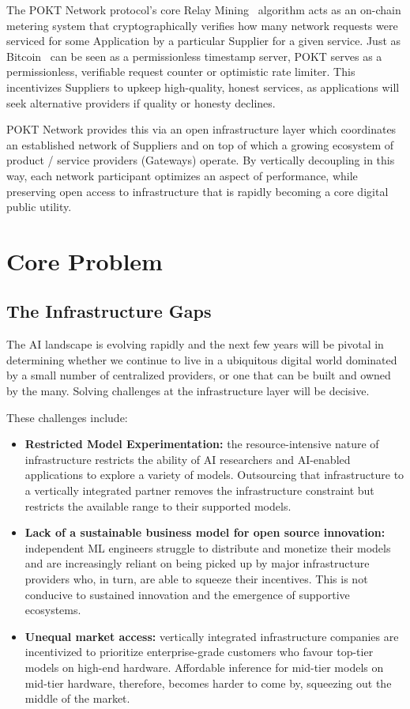 \documentclass[conference,compsoc]{IEEEtran}
\begin{document}
The POKT Network protocol's core Relay Mining~\cite{olshansky2023relay} algorithm acts as an on-chain metering system that cryptographically verifies how many network requests were serviced for some Application by a particular Supplier for a given service. Just as Bitcoin~\cite{nakamoto2008bitcoin} can be seen as a permissionless timestamp server, POKT serves as a permissionless, verifiable request counter or optimistic rate limiter. This incentivizes Suppliers to upkeep high-quality, honest services, as applications will seek alternative providers if quality or honesty declines.

POKT Network provides this via an open infrastructure layer which coordinates an established network of Suppliers and on top of which a growing ecosystem of product / service providers (Gateways) operate. By vertically decoupling in this way, each network participant optimizes an aspect of performance, while preserving open access to infrastructure that is rapidly becoming a core digital public utility. 

\section{Core Problem}

\subsection{The Infrastructure Gaps}

The AI landscape is evolving rapidly and the next few years will be pivotal in determining whether we continue to live in a ubiquitous digital world dominated by a small number of centralized providers, or one that can be built and owned by the many. Solving challenges at the infrastructure layer will be decisive. 

These challenges include:
\begin{itemize}
    \item \textbf{Restricted Model Experimentation:} the resource-intensive nature of infrastructure restricts the ability of AI researchers and AI-enabled applications to explore a variety of models. Outsourcing that infrastructure to a vertically integrated partner removes the infrastructure constraint but restricts the available range to their supported models. 
    \item \textbf{Lack of a sustainable business model for open source innovation:} independent ML engineers struggle to distribute and monetize their models and are increasingly reliant on being picked up by major infrastructure providers who, in turn, are able to squeeze their incentives. This is not conducive to sustained innovation and the emergence of supportive ecosystems.
    \item \textbf{Unequal market access:} vertically integrated infrastructure companies are incentivized to prioritize enterprise-grade customers who favour top-tier models on high-end hardware. Affordable inference for mid-tier models on mid-tier hardware, therefore, becomes harder to come by, squeezing out the middle of the market.
\end{itemize}
\end{document}
